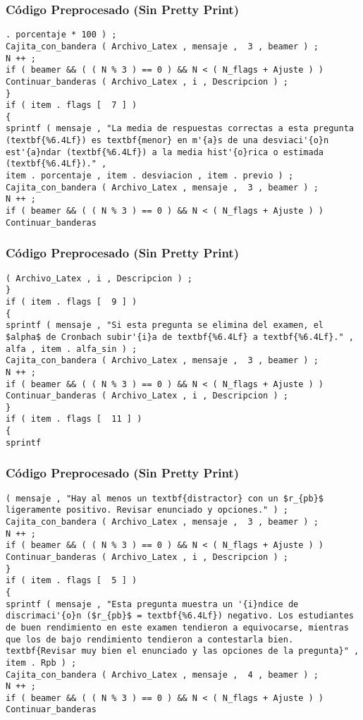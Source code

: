 \documentclass{beamer}
\begin{document}
\begin{frame}[fragile]
\frametitle{C\'odigo Preprocesado (Sin Pretty Print)}
\begin{lstlisting}[style=CStyle]
. porcentaje * 100 ) ; 
Cajita_con_bandera ( Archivo_Latex , mensaje ,  3 , beamer ) ; 
N ++ ; 
if ( beamer && ( ( N % 3 ) == 0 ) && N < ( N_flags + Ajuste ) ) 
Continuar_banderas ( Archivo_Latex , i , Descripcion ) ; 
} 
if ( item . flags [  7 ] ) 
{ 
sprintf ( mensaje , "La media de respuestas correctas a esta pregunta (textbf{%6.4Lf}) es textbf{menor} en m'{a}s de una desviaci'{o}n est'{a}ndar (textbf{%6.4Lf}) a la media hist'{o}rica o estimada (textbf{%6.4Lf})." , 
item . porcentaje , item . desviacion , item . previo ) ; 
Cajita_con_bandera ( Archivo_Latex , mensaje ,  3 , beamer ) ; 
N ++ ; 
if ( beamer && ( ( N % 3 ) == 0 ) && N < ( N_flags + Ajuste ) ) 
Continuar_banderas \end{lstlisting}
\end{frame}
\begin{frame}[fragile]
\frametitle{C\'odigo Preprocesado (Sin Pretty Print)}
\begin{lstlisting}[style=CStyle]
( Archivo_Latex , i , Descripcion ) ; 
} 
if ( item . flags [  9 ] ) 
{ 
sprintf ( mensaje , "Si esta pregunta se elimina del examen, el $alpha$ de Cronbach subir'{i}a de textbf{%6.4Lf} a textbf{%6.4Lf}." , 
alfa , item . alfa_sin ) ; 
Cajita_con_bandera ( Archivo_Latex , mensaje ,  3 , beamer ) ; 
N ++ ; 
if ( beamer && ( ( N % 3 ) == 0 ) && N < ( N_flags + Ajuste ) ) 
Continuar_banderas ( Archivo_Latex , i , Descripcion ) ; 
} 
if ( item . flags [  11 ] ) 
{ 
sprintf \end{lstlisting}
\end{frame}
\begin{frame}[fragile]
\frametitle{C\'odigo Preprocesado (Sin Pretty Print)}
\begin{lstlisting}[style=CStyle]
( mensaje , "Hay al menos un textbf{distractor} con un $r_{pb}$ ligeramente positivo. Revisar enunciado y opciones." ) ; 
Cajita_con_bandera ( Archivo_Latex , mensaje ,  3 , beamer ) ; 
N ++ ; 
if ( beamer && ( ( N % 3 ) == 0 ) && N < ( N_flags + Ajuste ) ) 
Continuar_banderas ( Archivo_Latex , i , Descripcion ) ; 
} 
if ( item . flags [  5 ] ) 
{ 
sprintf ( mensaje , "Esta pregunta muestra un '{i}ndice de discrimaci'{o}n ($r_{pb}$ = textbf{%6.4Lf}) negativo. Los estudiantes de buen rendimiento en este examen tendieron a equivocarse, mientras que los de bajo rendimiento tendieron a contestarla bien. textbf{Revisar muy bien el enunciado y las opciones de la pregunta}" , 
item . Rpb ) ; 
Cajita_con_bandera ( Archivo_Latex , mensaje ,  4 , beamer ) ; 
N ++ ; 
if ( beamer && ( ( N % 3 ) == 0 ) && N < ( N_flags + Ajuste ) ) 
Continuar_banderas \end{lstlisting}
\end{frame}
\end{document}
